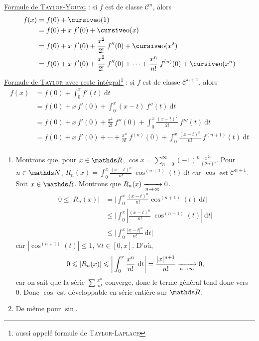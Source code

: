 \begin{rap}
	\ul{Formule de \textsc{Taylor-Young}} : si $f$\/ est de classe $\mathcal{C}^n$, alors
	\begin{align*}
		f(x) &= f(0) + \po(1)\\
		&= f(0) + x\: f'(0) + \po(x)\\
		&= f(0) + x\: f'(0) + \frac{x^2}{2!}\:f''(0) + \po(x^2)\\
		&= f(0) + x\: f'(0) + \frac{x^2}{2!}\:f''(0) + \cdots + \frac{x^n}{n!}\:f^{(n)}(0) + \po(x^n)
	\end{align*}
	\ul{Formule de \textsc{Taylor} avec reste intégral\footnote{aussi appelé formule de \textsc{Taylor-Laplace}}} : si $f$\/ est de classe $\mathcal{C}^{n+1}$, alors
	\begin{align*}
		f(x) &= f(0) + \int_{0}^{x} f'(t)~\mathrm{d}t \\
		&= f(0) + x\:f'(0) + \int_{0}^{x} (x-t)\: f''(t)~\mathrm{d}t \\
		&= f(0) + x\:f'(0) + \frac{x^2}{2!}\: f''(0) + \int_{0}^{x} \frac{(x-t)^2}{2!}\: f'''(t)~\mathrm{d}t \\
		&= f(0) + x\:f'(0) + \cdots + \frac{x^n}{n!}\: f^{(n)}(0) + \int_{0}^{x} \frac{(x-t)^n}{n!}\: f^{(n+1)}(t)~\mathrm{d}t \\
	\end{align*}
\end{rap}

\begin{exo}
	\begin{enumerate}
		\item Montrons que, pour $x \in \R$, $\cos x = \sum_{n=0}^\infty (-1)^n \frac{x^{2n}}{(2n)!}$.
			Pour $n \in \N$, $R_n(x) = \int_{0}^{x} \frac{(x-t)^n}{n!}\: \cos^{(n+1)}(t)~\mathrm{d}t$\/ car $\cos$\/ est $\mathcal{C}^{n+1}$.
			Soit $x \in \R$. Montrons que $R_n(x) \xrightarrow[n\to \infty]{} 0$.
			\begin{align*}
				0 \le |R_n(x)| &= \bigg| \int_{0}^{x} \frac{(x-t)^n}{n!} \cos^{(n+1)}(t)~\mathrm{d}t \bigg|\\
				&\le \bigg|\int_{0}^{x} \left| \frac{(x-t)^n}{n!}\: \cos ^{(n+1)}(t) \right|~\mathrm{d}t\bigg|\\
				&\le \bigg|\int_{0}^{x} \frac{|x-t|^n}{n!}~\mathrm{d}t\bigg|
			\end{align*}
			car $|\cos^{(n+1)}(t)| \le 1$, $\forall t \in [0,x]$.
			D'où, \[
				0 \leqslant |R_n(x)| \leqslant \bigg| \int_{0}^{x} \frac{x^n}{n!}~\mathrm{d}t \bigg| = \frac{|x|^{n+1}}{n!} \xrightarrow[n\to \infty]{} 0
			,\] car on sait que la série $\sum \frac{x^n}{n!}$\/ converge, donc le terme général tend donc vers 0.
			Donc $\cos$\/ est développable en série entière sur $\R$.
		\item De même pour $\sin$.
	\end{enumerate}
\end{exo}
